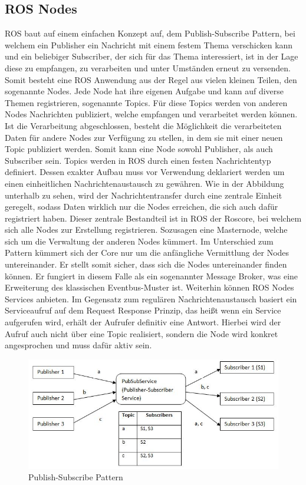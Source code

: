 \subsection{ROS Nodes}
ROS baut auf einem einfachen Konzept auf, dem Publish-Subscribe Pattern, bei welchem ein Publisher ein Nachricht mit einem festem Thema verschicken kann und ein beliebiger Subscriber, der sich für das Thema interessiert, ist in der Lage diese zu empfangen, zu verarbeiten und unter Umständen erneut zu versenden.  Somit besteht eine ROS Anwendung aus der Regel aus vielen kleinen Teilen, den sogenannte Nodes. Jede Node hat ihre eigenen Aufgabe und kann auf diverse Themen registrieren, sogenannte Topics. Für diese Topics werden von anderen Nodes Nachrichten publiziert, welche empfangen und verarbeitet werden können. Ist die Verarbeitung abgeschlossen, besteht die Möglichkeit die verarbeiteten Daten für andere Nodes zur Verfügung zu stellen, in dem sie mit einer neuen Topic publiziert werden. Somit kann eine Node sowohl Publisher, als auch Subscriber sein. Topics werden in ROS durch einen festen Nachrichtentyp definiert. Dessen exakter Aufbau muss vor Verwendung deklariert werden um einen einheitlichen Nachrichtenaustausch zu gewähren. Wie in der Abbildung unterhalb zu sehen, wird der Nachrichtentransfer durch eine zentrale Einheit geregelt, sodass Daten wirklich nur die Nodes erreichen, die sich auch dafür registriert haben. Dieser zentrale Bestandteil ist in ROS der Roscore, bei welchem sich alle Nodes zur Erstellung registrieren. Sozusagen eine Masternode, welche sich um die Verwaltung der anderen Nodes kümmert. Im Unterschied zum Pattern kümmert sich der Core nur um die anfängliche Vermittlung der Nodes untereinander. Er stellt somit sicher, dass sich die Nodes untereinander finden können. Er fungiert in diesem Falle als ein sogenannter Message Broker\cite{messagebroker}, was eine Erweiterung des klassischen Eventbus-Muster ist\cite{eventbus}. Weiterhin können ROS Nodes Services anbieten. Im Gegensatz zum regulären Nachrichtenaustausch basiert ein Serviceaufruf auf dem Request Response Prinzip, das heißt wenn ein Service aufgerufen wird, erhält der Aufrufer definitiv eine Antwort. Hierbei wird der Aufruf auch nicht über eine Topic realisiert, sondern die Node wird konkret angesprochen und muss dafür aktiv sein.\cite{rosbook}\cite{rosconcepts}
\begin{figure}[ht]
		\centering
	\includegraphics[scale=0.7]{Bilder/pubsub1.jpg}
	\caption[Publish-Subscribe Pattern]{Publish-Subscribe Pattern}

\end{figure}
